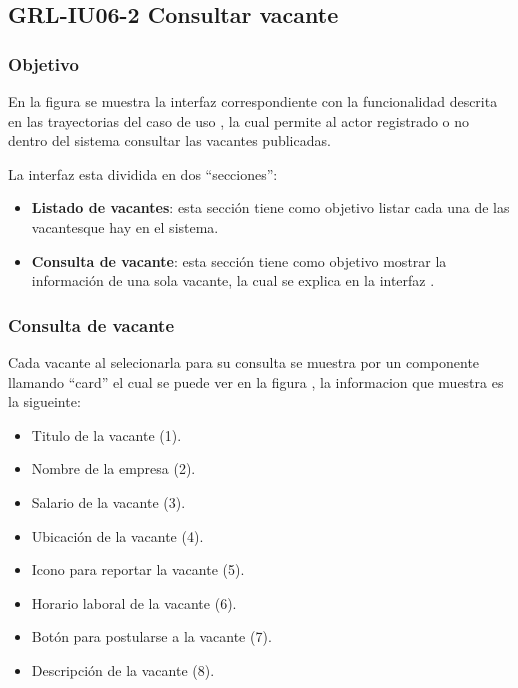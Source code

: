 \clearpage
\subsection{GRL-IU06-2 Consultar vacante}

\subsubsection{Objetivo}
En la figura  se muestra la interfaz correspondiente con la funcionalidad descrita en las
trayectorias del caso de uso  , la cual permite al actor registrado o no dentro del sistema consultar 
las vacantes publicadas.

La interfaz esta dividida en dos ``secciones'':
\begin{itemize}
   \item \textbf{Listado de vacantes}: esta sección tiene como objetivo listar cada una de las vacantesque hay en el sistema.
   \item \textbf{Consulta de vacante}: esta sección tiene como objetivo mostrar la información de una sola vacante, la cual se explica en 
   la interfaz .
\end{itemize}


\subsubsection{Consulta de vacante}
Cada vacante al selecionarla para su consulta se muestra por un componente llamando ``card'' el cual se puede ver en la figura , la informacion que 
muestra es la sigueinte: 
\begin{itemize}
   \item Titulo de la vacante (1).
   \item Nombre de la empresa (2).
   \item Salario de la vacante (3).
   \item Ubicación de la vacante (4).
   \item Icono para reportar la vacante (5).
   \item Horario laboral de la vacante (6).
   \item Botón para postularse a la vacante (7).
   \item Descripción de la vacante (8).
\end{itemize}




\clearpage
